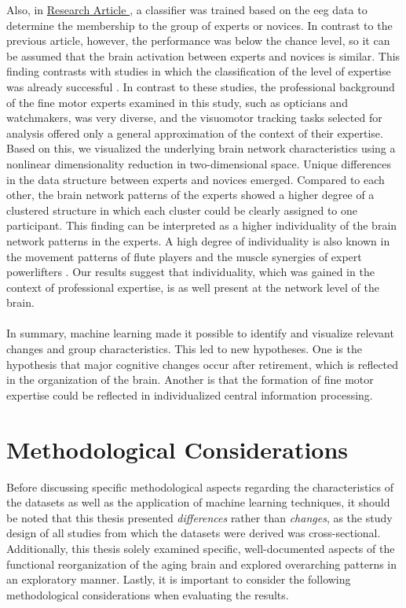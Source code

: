 Also, in \hyperref[results:paperIV]{Research Article }, a classifier was trained based on the \gls{eeg} data to determine the membership to the group of experts or novices. In contrast to the previous article, however, the performance was below the chance level, so it can be assumed that the brain activation between experts and novices is similar. This finding contrasts with studies in which the classification of the level of expertise was already successful \cite{Hosp2021, Winkler-Schwartz2019, Shourie2016}. In contrast to these studies, the professional background of the fine motor experts examined in this study, such as opticians and watchmakers, was very diverse, and the visuomotor tracking tasks selected for analysis offered only a general approximation of the context of their expertise. Based on this, we visualized the underlying brain network characteristics using a nonlinear dimensionality reduction in two-dimensional space. Unique differences in the data structure between experts and novices emerged. Compared to each other, the brain network patterns of the experts showed a higher degree of a clustered structure in which each cluster could be clearly assigned to one participant. This finding can be interpreted as a higher individuality of the brain network patterns in the experts. A high degree of individuality is also known in the movement patterns of flute players and the muscle synergies of expert powerlifters \cite{Albrecht2014, Caramiaux2018, Kristiansen2015}. Our results suggest that individuality, which was gained in the context of professional expertise, is as well present at the network level of the brain.\\
\\
In summary, machine learning made it possible to identify and visualize relevant changes and group characteristics. This led to new hypotheses. One is the hypothesis that major cognitive changes occur after retirement, which is reflected in the organization of the brain. Another is that the formation of fine motor expertise could be reflected in individualized central information processing.

\section{Methodological Considerations}
Before discussing specific methodological aspects regarding the characteristics of the datasets as well as the application of machine learning techniques, it should be noted that this thesis presented \textit{differences} rather than \textit{changes}, as the study design of all studies from which the datasets were derived was cross-sectional. Additionally, this thesis solely examined specific, well-documented aspects of the functional reorganization of the aging brain and explored overarching patterns in an exploratory manner. Lastly, it is important to consider the following methodological considerations when evaluating the results. 

